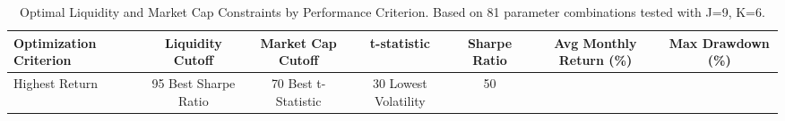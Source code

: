 \begin{table}
\caption{Optimal Liquidity and Market Cap Constraints by Performance Criterion. Based on 81 parameter combinations tested with J=9, K=6.}
\label{tab:constraints_optimal}
\begin{tabular}{l|cc|cccc}
\toprule
Optimization Criterion & Liquidity Cutoff & Market Cap Cutoff & t-statistic & Sharpe Ratio & Avg Monthly Return (\%) & Max Drawdown (\%) \\
\midrule
Highest Return & 95%
Best Sharpe Ratio & 70%
Best t-Statistic & 30%
Lowest Volatility & 50%
\bottomrule
\end{tabular}
\end{table}
